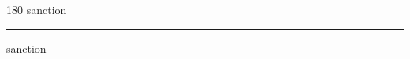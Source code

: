 
\begin{frame}
\begin{center}
\begin{turn}{180}
{\fontsize{2.5cm}{1em}\selectfont sanction}
\end{turn}
\vspace{1em}\par  
\hrule
\vspace{1em}\par  
{\fontsize{2.5cm}{1em}\selectfont sanction}
\end{center}
\end{frame}
